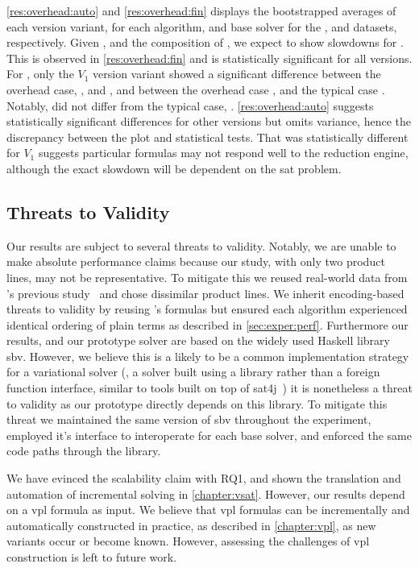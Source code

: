 %
\autoref{res:overhead:auto} and \autoref{res:overhead:fin} displays the
bootstrapped averages of each version variant, for each algorithm, and base
solver for the \auto{}, and \fin{} datasets, respectively. Given , and
the composition of \fin{}, we expect \vsat{} to show slowdowns for \fin{}. This
is observed in \autoref{res:overhead:fin} and is statistically significant for
all versions. For \auto{}, only the $V_{1}$ version variant showed a significant
difference between the overhead case, \pTov{}, and \vTov{}, and between the
overhead case \pTov{}, and the typical case \vTop{}. Notably, \vTov{} did not
differ from the typical case, \vTop{}. \autoref{res:overhead:auto} suggests
statistically significant differences for other versions but omits variance,
hence the discrepancy between the plot and statistical tests. That \pTov{} was
statistically different for $V_{1}$ suggests particular formulas may not respond
well to the reduction engine, although the exact slowdown will be dependent on
the \ac{sat} problem.

\subsection{Threats to Validity}
Our results are subject to several threats to validity. Notably, we are unable
to make absolute performance claims because our study, with only two product
lines, may not be representative. To mitigate this we reused real-world data
from \nieke{}'s previous study~\citep{NMS+:GPCE18} and chose dissimilar product
lines. We inherit encoding-based threats to validity by reusing \nieke{}'s
formulas but ensured each algorithm experienced identical ordering of plain
terms as described in \autoref{sec:exper:perf}. Furthermore our results, and our
prototype solver are based on the widely used Haskell library sbv. However, we
believe this is a likely to be a common implementation strategy for a
variational solver (\ie{}, a solver built using a library rather than a foreign
function interface, similar to tools built on top of sat4j~\citep{LP:JSAT10}) it
is nonetheless a threat to validity as our prototype directly depends on this
library. To mitigate this threat we maintained the same version of sbv
throughout the experiment, employed it's interface to interoperate for each base
solver, and enforced the same code paths through the library.

We have evinced the scalability claim with RQ1, and shown the translation and
automation of incremental solving in \autoref{chapter:vsat}. However, our
results depend on a \ac{vpl} formula as input. We believe that \ac{vpl} formulas
can be incrementally and automatically constructed in practice, as described in
\autoref{chapter:vpl}, as new variants occur or become known. However, assessing
the challenges of \ac{vpl} construction is left to future work.

